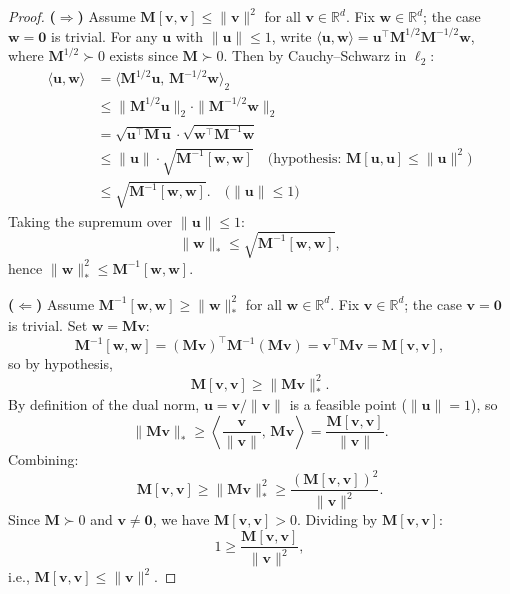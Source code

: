 \begin{proof}
\textbf{($\Rightarrow$)}
Assume $\mathbf{M}[\mathbf{v}, \mathbf{v}] \leq \|\mathbf{v}\|^2$ for all $\mathbf{v} \in \mathbb{R}^d$. Fix $\mathbf{w} \in \mathbb{R}^d$; the case $\mathbf{w} = \mathbf{0}$ is trivial. For any $\mathbf{u}$ with $\|\mathbf{u}\| \leq 1$, write $\langle \mathbf{u}, \mathbf{w} \rangle = \mathbf{u}^\top \mathbf{M}^{1/2} \mathbf{M}^{-1/2} \mathbf{w}$, where $\mathbf{M}^{1/2} \succ 0$ exists since $\mathbf{M} \succ 0$. Then by Cauchy--Schwarz in $\ell_2$:
\begin{align*}
\langle \mathbf{u}, \mathbf{w} \rangle &= \langle \mathbf{M}^{1/2}\mathbf{u},\, \mathbf{M}^{-1/2}\mathbf{w} \rangle_2 \\
&\leq \|\mathbf{M}^{1/2}\mathbf{u}\|_2 \cdot \|\mathbf{M}^{-1/2}\mathbf{w}\|_2 \\
&= \sqrt{\mathbf{u}^\top \mathbf{M}\, \mathbf{u}} \cdot \sqrt{\mathbf{w}^\top \mathbf{M}^{-1} \mathbf{w}} \\
&\leq \|\mathbf{u}\| \cdot \sqrt{\mathbf{M}^{-1}[\mathbf{w}, \mathbf{w}]} \quad \text{(hypothesis: $\mathbf{M}[\mathbf{u}, \mathbf{u}] \leq \|\mathbf{u}\|^2$)} \\
&\leq \sqrt{\mathbf{M}^{-1}[\mathbf{w}, \mathbf{w}]}. \quad \text{($\|\mathbf{u}\| \leq 1$)}
\end{align*}
Taking the supremum over $\|\mathbf{u}\| \leq 1$:
\[
\|\mathbf{w}\|_* \leq \sqrt{\mathbf{M}^{-1}[\mathbf{w}, \mathbf{w}]},
\]
hence $\|\mathbf{w}\|_*^2 \leq \mathbf{M}^{-1}[\mathbf{w}, \mathbf{w}]$.

\bigskip

\textbf{($\Leftarrow$)}
Assume $\mathbf{M}^{-1}[\mathbf{w}, \mathbf{w}] \geq \|\mathbf{w}\|_*^2$ for all $\mathbf{w} \in \mathbb{R}^d$. Fix $\mathbf{v} \in \mathbb{R}^d$; the case $\mathbf{v} = \mathbf{0}$ is trivial. Set $\mathbf{w} = \mathbf{M}\mathbf{v}$:
\[
\mathbf{M}^{-1}[\mathbf{w}, \mathbf{w}] = (\mathbf{M}\mathbf{v})^\top \mathbf{M}^{-1}(\mathbf{M}\mathbf{v}) = \mathbf{v}^\top \mathbf{M} \mathbf{v} = \mathbf{M}[\mathbf{v}, \mathbf{v}],
\]
so by hypothesis,
\[
\mathbf{M}[\mathbf{v}, \mathbf{v}] \geq \|\mathbf{M}\mathbf{v}\|_*^2.
\]
By definition of the dual norm, $\mathbf{u} = \mathbf{v}/\|\mathbf{v}\|$ is a feasible point ($\|\mathbf{u}\| = 1$), so
\[
\|\mathbf{M}\mathbf{v}\|_* \geq \left\langle \frac{\mathbf{v}}{\|\mathbf{v}\|},\, \mathbf{M}\mathbf{v} \right\rangle = \frac{\mathbf{M}[\mathbf{v}, \mathbf{v}]}{\|\mathbf{v}\|}.
\]
Combining:
\[
\mathbf{M}[\mathbf{v}, \mathbf{v}] \geq \|\mathbf{M}\mathbf{v}\|_*^2 \geq \frac{(\mathbf{M}[\mathbf{v}, \mathbf{v}])^2}{\|\mathbf{v}\|^2}.
\]
Since $\mathbf{M} \succ 0$ and $\mathbf{v} \neq \mathbf{0}$, we have $\mathbf{M}[\mathbf{v}, \mathbf{v}] > 0$. Dividing by $\mathbf{M}[\mathbf{v}, \mathbf{v}]$:
\[
1 \geq \frac{\mathbf{M}[\mathbf{v}, \mathbf{v}]}{\|\mathbf{v}\|^2},
\]
i.e., $\mathbf{M}[\mathbf{v}, \mathbf{v}] \leq \|\mathbf{v}\|^2$.
\end{proof}

